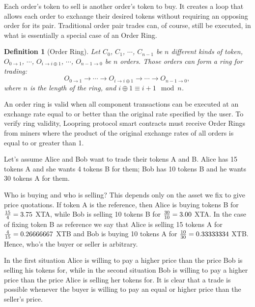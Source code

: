 \documentclass[UTF8,nofonts]{article}
\makeatletter
\newtheorem{definition}{Definition}[section]
\newenvironment{figurehere}
 {\def\@captype{figure}}
 {}
\makeatother
\begin{document}
\begin{multicols}{2}
\begin{center}
\begin{figurehere}
\caption{A Ring of 3 Orders}
\label{fig:ring}
\end{figurehere}
\end{center}


Each order's token to sell is another order's token to buy. It creates a loop that allows each order to exchange their desired tokens without requiring an opposing order for its pair. Traditional order pair trades can, of course, still be executed, in what is essentially a special case of an Order Ring. 

\begin{definition}[Order Ring] Let $C_{0}$, $C_{1}$, $\cdots$, $C_{n-1}$ be $n$ different kinds of token, $O_{0\rightarrow 1}$, $\cdots$, $O_{i\rightarrow i\oplus 1}$, $\cdots$, $O_{n-1 \rightarrow 0}$ be $n$ orders. Those orders can form a ring for trading:
$$O_{0\rightarrow 1} \rightarrow \cdots \rightarrow O_{i\rightarrow i\oplus 1} \rightarrow \cdots \rightarrow O_{n-1\rightarrow 0} \text{, }$$
where $n$ is the length of the ring, and $i\oplus 1 \equiv i+1 \mod n$.
\end{definition}

An order ring is valid when all component transactions can be executed at an exchange rate equal to or better than the original rate specified by the user. To verify ring validity, Loopring protocol smart contracts must receive Order Rings from miners where the product of the original exchange rates of all orders is equal to or greater than 1.

Let's assume Alice and Bob want to trade their tokens A and B. Alice has 15 tokens A and she wants 4 tokens B for them; Bob has 10 tokens B  and he wants 30 tokens A for them.

Who is buying and who is selling? This depends only on the asset we fix to give price quotations. If token A is the reference, then Alice is buying tokens B for ${15 \over 4} = 3.75$ XTA, while Bob is selling 10 tokens B for ${30 \over 10} = 3.00$ XTA. In the case of fixing token B as reference we say that Alice is selling 15 tokens A for ${4\over 15}=0.26666667$ XTB and Bob is buying 10 tokens A for ${10 \over 30}=0.33333334$ XTB. Hence, who's the buyer or seller is arbitrary.

In the first situation Alice is willing to pay a higher price than the price Bob is selling his tokens for, while in the second situation Bob is willing to pay a higher price than the price Alice is selling her tokens for. It is clear that a trade is possible whenever the buyer is willing to pay an equal or higher price than the seller's price.


\end{multicols}
\end{document}
